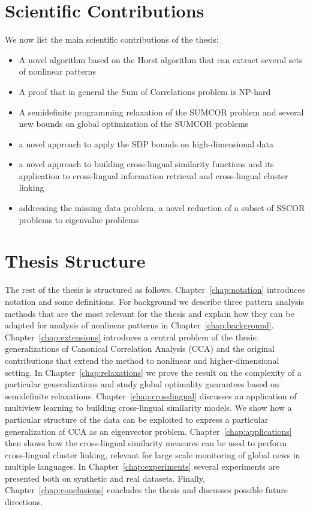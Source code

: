 \section{Scientific Contributions}

We now list the main scientific contributions of the thesis:
\begin{itemize}
\item A novel algorithm based on the Horst algorithm that can extract several sets of nonlinear patterns
\item A proof that in general the Sum of Correlations problem is NP-hard
\item A semidefinite programming relaxation of the SUMCOR problem and
several new bounds on global optimization of the SUMCOR problems
\item a novel approach to apply the SDP bounds on high-dimensional data
\item a novel approach to building cross-lingual similarity functions and its application to cross-lingual information retrieval and cross-lingual cluster linking
\item addressing the missing data problem, a novel reduction of a subset of SSCOR problems to eigenvalue problems
\end{itemize}

\section{Thesis Structure}

The rest of the thesis is structured as follows. Chapter~\ref{chap:notation} introduces notation and some
definitions. For background we describe three pattern analysis methods that are the most relevant
for the thesis and explain how they can be adapted for analysis of nonlinear patterns in Chapter~\ref{chap:background}. Chapter~\ref{chap:extensions}
introduces a central problem of the thesis: generalizations of Canonical Correlation Analysis (CCA) and the original
contributions that extend the method to nonlinear and higher-dimensional setting. In Chapter~\ref{chap:relaxations}
we prove the result on the complexity of a particular generalizations and study global optimality guarantees based
on semidefinite relaxations. Chapter~\ref{chap:crosslingual} discusses an application of multiview learning
to building cross-lingual similarity models. We show how a particular structure of the data can be exploited
to express a particular generalization of CCA as an eigenvector problem. Chapter~\ref{chap:applications} then
shows how the cross-lingual similarity measures can be used to perform cross-lingual cluster linking, relevant
for large scale monitoring of global news in multiple languages. In Chapter~\ref{chap:experiments} several experiments
are presented both on synthetic and real datasets. Finally, Chapter~\ref{chap:conclusions} concludes the thesis
and discusses possible future directions.